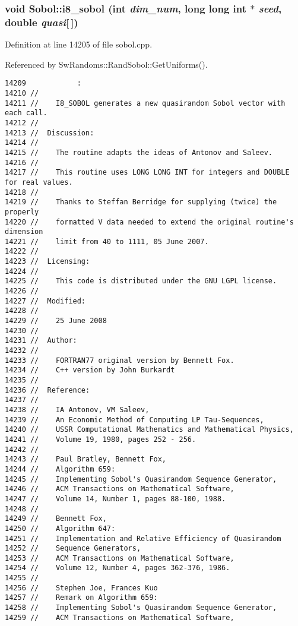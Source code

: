 \subsubsection{\setlength{\rightskip}{0pt plus 5cm}void Sobol::i8\_\-sobol (int {\em dim\_\-num}, long long int $\ast$ {\em seed}, double {\em quasi}[$\,$])}\label{namespaceSobol_1df68ce8fabb1764e491885b5e1c366b}




Definition at line 14205 of file sobol.cpp.

Referenced by SwRandoms::RandSobol::GetUniforms().

\begin{Code}\begin{verbatim}14209            :
14210 //
14211 //    I8_SOBOL generates a new quasirandom Sobol vector with each call.
14212 //
14213 //  Discussion:
14214 //
14215 //    The routine adapts the ideas of Antonov and Saleev.
14216 //
14217 //    This routine uses LONG LONG INT for integers and DOUBLE for real values.
14218 //
14219 //    Thanks to Steffan Berridge for supplying (twice) the properly
14220 //    formatted V data needed to extend the original routine's dimension
14221 //    limit from 40 to 1111, 05 June 2007.
14222 //
14223 //  Licensing:
14224 //
14225 //    This code is distributed under the GNU LGPL license. 
14226 //
14227 //  Modified:
14228 //
14229 //    25 June 2008
14230 //
14231 //  Author:
14232 //
14233 //    FORTRAN77 original version by Bennett Fox.
14234 //    C++ version by John Burkardt
14235 //
14236 //  Reference:
14237 //
14238 //    IA Antonov, VM Saleev,
14239 //    An Economic Method of Computing LP Tau-Sequences,
14240 //    USSR Computational Mathematics and Mathematical Physics,
14241 //    Volume 19, 1980, pages 252 - 256.
14242 //
14243 //    Paul Bratley, Bennett Fox,
14244 //    Algorithm 659:
14245 //    Implementing Sobol's Quasirandom Sequence Generator,
14246 //    ACM Transactions on Mathematical Software,
14247 //    Volume 14, Number 1, pages 88-100, 1988.
14248 //
14249 //    Bennett Fox,
14250 //    Algorithm 647:
14251 //    Implementation and Relative Efficiency of Quasirandom 
14252 //    Sequence Generators,
14253 //    ACM Transactions on Mathematical Software,
14254 //    Volume 12, Number 4, pages 362-376, 1986.
14255 //
14256 //    Stephen Joe, Frances Kuo
14257 //    Remark on Algorithm 659:
14258 //    Implementing Sobol's Quasirandom Sequence Generator,
14259 //    ACM Transactions on Mathematical Software,

\end{verbatim}
\end{Code}
